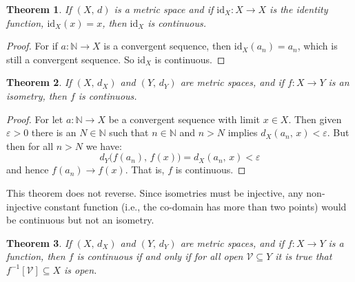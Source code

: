 \documentclass{article}
\theoremstyle{plain}
\newtheorem{theorem}{Theorem}[section]
\theoremstyle{normal}
\begin{document}
        \begin{theorem}
            If $(X,\,d)$ is a metric space and if
            $\textrm{id}_{X}:X\rightarrow{X}$ is the identity function,
            $\textrm{id}_{X}(x)=x$, then $\textrm{id}_{X}$ is continuous.
        \end{theorem}
        \begin{proof}
            For if $a:\mathbb{N}\rightarrow{X}$ is a convergent sequence, then
            $\textrm{id}_{X}(a_{n})=a_{n}$, which is still a convergent
            sequence. So $\textrm{id}_{X}$ is continuous.
        \end{proof}
        \begin{theorem}
            If $(X,\,d_{X})$ and $(Y,\,d_{Y})$ are metric spaces, and if
            $f:X\rightarrow{Y}$ is an isometry, then $f$ is continuous.
        \end{theorem}
        \begin{proof}
            For let $a:\mathbb{N}\rightarrow{X}$ be a convergent sequence with
            limit $x\in{X}$. Then given $\varepsilon>0$ there is an
            $N\in\mathbb{N}$ such that $n\in\mathbb{N}$ and $n>N$ implies
            $d_{X}(a_{n},\,x)<\varepsilon$. But then for all $n>N$ we have:
            \begin{equation}
                d_{Y}\big(f(a_{n}),\,f(x)\big)
                    =d_{X}(a_{n},\,x)
                    <\varepsilon
            \end{equation}
            and hence $f(a_{n})\rightarrow{f}(x)$. That is, $f$ is continuous.
        \end{proof}
        This theorem does not reverse. Since isometries must be injective,
        any non-injective constant function (i.e., the co-domain has more than
        two points) would be continuous but not an isometry.
        \begin{theorem}
            If $(X,\,d_{X})$ and $(Y,\,d_{Y})$ are metric spaces, and if
            $f:X\rightarrow{Y}$ is a function, then $f$ is continuous if and
            only if for all open $\mathcal{V}\subseteq{Y}$ it is true that
            $f^{-1}[\mathcal{V}]\subseteq{X}$ is open.
        \end{theorem}
\end{document}
